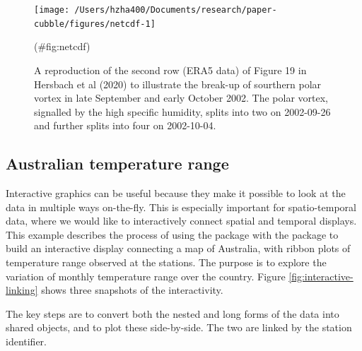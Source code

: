 \documentclass[
]{jss}
\begin{document}
\begin{CodeChunk}
\begin{figure}

{\centering \texttt{[image: /Users/hzha400/Documents/research/paper-cubble/figures/netcdf-1]} 

}

\caption[A reproduction of the second row (ERA5 data) of Figure 19 in Hersbach et al (2020) to illustrate the break-up of sourthern polar vortex in late September and early October 2002]{A reproduction of the second row (ERA5 data) of Figure 19 in Hersbach et al (2020) to illustrate the break-up of sourthern polar vortex in late September and early October 2002. The polar vortex, signalled by the high specific humidity, splits into two on 2002-09-26 and further splits into four on 2002-10-04.}(\#fig:netcdf)
\end{figure}
\end{CodeChunk}

\hypertarget{australian-temperature-range}{%
\subsection{Australian temperature
range}\label{australian-temperature-range}}

Interactive graphics can be useful because they make it possible to look
at the data in multiple ways on-the-fly. This is especially important
for spatio-temporal data, where we would like to interactively connect
spatial and temporal displays. This example describes the process of
using the  package with the  package to build
an interactive display connecting a map of Australia, with ribbon plots
of temperature range observed at the stations. The purpose is to explore
the variation of monthly temperature range over the country. Figure
\ref{fig:interactive-linking} shows three snapshots of the
interactivity.

The key steps are to convert both the nested and long forms of the data
into shared  objects, and to plot these side-by-side.
The two are linked by the station identifier.
\end{document}
